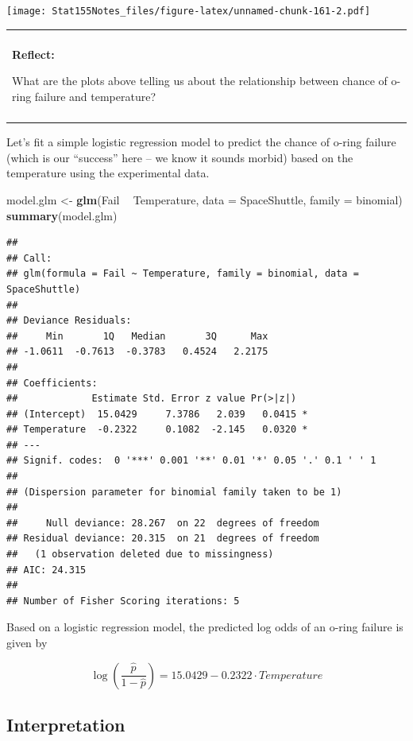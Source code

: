 \documentclass[]{book}
\newenvironment{Shaded}{\begin{snugshade}}{\end{snugshade}}
\newcommand{\DataTypeTok}[1]{\textcolor[rgb]{0.13,0.29,0.53}{#1}}
\newcommand{\KeywordTok}[1]{\textcolor[rgb]{0.13,0.29,0.53}{\textbf{#1}}}
\newcommand{\NormalTok}[1]{#1}
\newcommand{\OperatorTok}[1]{\textcolor[rgb]{0.81,0.36,0.00}{\textbf{#1}}}
\newcommand{\StringTok}[1]{\textcolor[rgb]{0.31,0.60,0.02}{#1}}
\newenvironment{reflect}
{
    \begin{center}
    
    \begin{tabular}{|p{0.8\textwidth}|}
    \rowcolor{LightBlue}
    \hline\\
    \rowcolor{LightBlue}
    \textbf{Reflect:}
}
{
    \\\rowcolor{LightBlue}
    \\\hline
    \end{tabular} 
    \end{center}
}
\begin{document}
\texttt{[image: Stat155Notes\_files/figure-latex/unnamed-chunk-161-2.pdf]}

\begin{reflect}
What are the plots above telling us about the relationship between
chance of o-ring failure and temperature?
\end{reflect}

Let's fit a simple logistic regression model to predict the chance of o-ring failure (which is our ``success'' here -- we know it sounds morbid) based on the temperature using the experimental data.

\begin{Shaded}
\begin{Highlighting}[]
\NormalTok{model.glm <-}\StringTok{ }\KeywordTok{glm}\NormalTok{(Fail }\OperatorTok{~}\StringTok{ }\NormalTok{Temperature, }\DataTypeTok{data =}\NormalTok{ SpaceShuttle, }\DataTypeTok{family =}\NormalTok{ binomial)}
\KeywordTok{summary}\NormalTok{(model.glm)}
\end{Highlighting}
\end{Shaded}

\begin{verbatim}
## 
## Call:
## glm(formula = Fail ~ Temperature, family = binomial, data = SpaceShuttle)
## 
## Deviance Residuals: 
##     Min       1Q   Median       3Q      Max  
## -1.0611  -0.7613  -0.3783   0.4524   2.2175  
## 
## Coefficients:
##             Estimate Std. Error z value Pr(>|z|)  
## (Intercept)  15.0429     7.3786   2.039   0.0415 *
## Temperature  -0.2322     0.1082  -2.145   0.0320 *
## ---
## Signif. codes:  0 '***' 0.001 '**' 0.01 '*' 0.05 '.' 0.1 ' ' 1
## 
## (Dispersion parameter for binomial family taken to be 1)
## 
##     Null deviance: 28.267  on 22  degrees of freedom
## Residual deviance: 20.315  on 21  degrees of freedom
##   (1 observation deleted due to missingness)
## AIC: 24.315
## 
## Number of Fisher Scoring iterations: 5
\end{verbatim}

Based on a logistic regression model, the predicted log odds of an o-ring failure is given by

\[\log\left(\frac{\hat{p}}{1-\hat{p}}\right) = 15.0429 -0.2322\cdot Temperature\]

\hypertarget{interpretation-1}{%
\subsection{Interpretation}\label{interpretation-1}}
\end{document}
